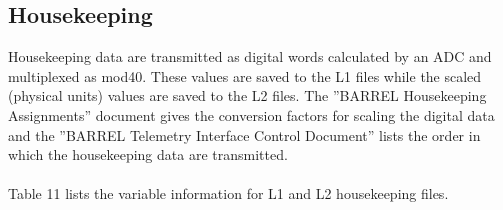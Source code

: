 \documentclass{article}
\begin{document}
\subsection{Housekeeping}
Housekeeping data are transmitted as digital words calculated by an ADC and multiplexed as mod40. These values are saved to the L1 files while the scaled (physical units) values are saved to the L2 files. The ''BARREL Housekeeping Assignments'' document gives the conversion factors for scaling the digital data and the ''BARREL Telemetry Interface Control Document'' lists the order in which the housekeeping data are transmitted.\\\\
Table 11 lists the variable information for L1 and L2 housekeeping files.\\\\
\end{document}
